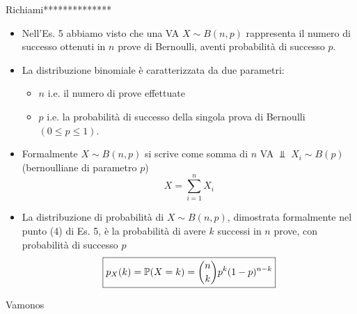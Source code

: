 Richiami**************
\begin{itemize}
\item Nell'Es. 5 abbiamo visto che una VA $X\sim B( n,p)$ rappresenta il numero di successo ottenuti in $n$ prove di Bernoulli, aventi probabilità di successo $p$.
\item La distribuzione binomiale è caratterizzata da due parametri:
\begin{itemize}
\item $n$ i.e. il numero di prove effettuate
\item $p$ i.e. la probabilità di successo della singola prova di Bernoulli $( 0\leq p\leq 1)$.
\end{itemize}
\item Formalmente $X\sim B( n,p)$ si scrive come somma di $n$ VA $\Bot $ $X_{i} \sim B( p)$ (bernoulliane di parametro $p$)\begin{equation*}
X=\sum\limits _{i=1}^{n} X_{i}
\end{equation*}
\item La distribuzione di probabilità di $X\sim B( n,p)$, dimostrata formalmente nel punto (4) di Es. 5, è la probabilità di avere $k$ successi in $n$ prove, con probabilità di successo $p$\begin{equation*}
\boxed{p_{X}( k) =\mathbb{P}( X=k) =\binom{n}{k} p^{k}( 1-p)^{n-k}}
\end{equation*}
\end{itemize}

Vamonos


